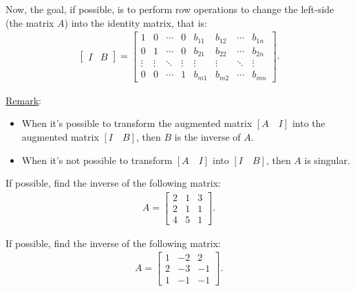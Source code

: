 \documentclass[12pt,a4paper]{article}
\newcounter{example}[section]
\begin{document}
\noindent Now, the goal, if possible, is to perform row operations to change the left-side (the matrix $A$) into the identity matrix, that is:
	\begin{align*}
	\begin{bmatrix}
	I & B
	\end{bmatrix}
	=
	\begin{bmatrix}
	1 & 0 & \cdots & 0 & b_{11} & b_{12} & \cdots & b_{1n} \\
	0 & 1 & \cdots & 0 & b_{21} & b_{22} & \cdots & b_{2n}  \\
	\vdots & \vdots & \ddots & \vdots & \vdots & \vdots & \ddots & \vdots \\
	0 & 0 & \cdots & 1 & b_{m1} & b_{m2} & \cdots & b_{mn}
	\end{bmatrix} .
	\end{align*}

\noindent\underline{Remark}: 
	\begin{itemize}
	\item When it's possible to transform the augmented matrix $[A \quad I ]$ into the augmented matrix $[I \quad B ]$, then $B$ is the inverse of $A$.
	\item When it's not possible to transform $[ A \quad I]$ into $[I \quad B]$, then $A$ is singular. 
	\end{itemize}

\vspace*{16pt}

\begin{example}\label{Example:InvertableMatrix}
If possible, find the inverse of the following matrix:
	\begin{align*}
	A = \begin{bmatrix}
	2 & 1 & 3 \\ 2 & 1 & 1 \\ 4 & 5 & 1
	\end{bmatrix} .
	\end{align*}
\end{example}

\newpage

\phantom{2}

\newpage

\begin{example}
If possible, find the inverse of the following matrix:
	\begin{align*}
	A = \begin{bmatrix}
	1 & -2 & 2 \\
	2 & -3 & -1 \\
	1 & -1 & -1
	\end{bmatrix} .
	\end{align*}
\end{example}
\end{document}
